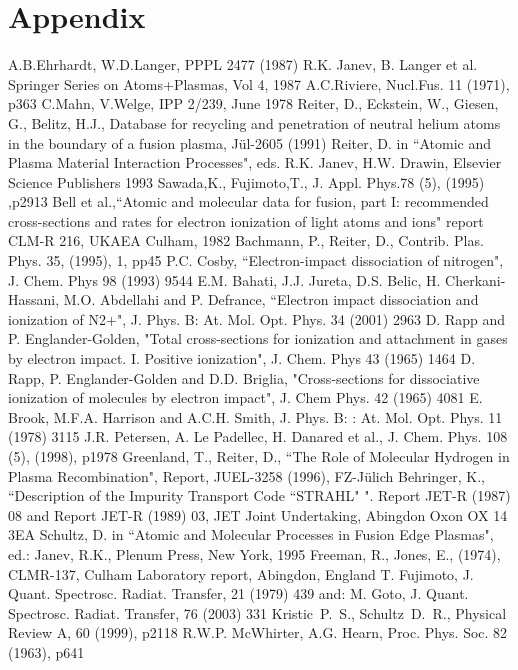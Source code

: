 \documentclass[12pt,dvipdfmx]{article}
\begin{document}
\section{Appendix}
\newpage
\begin{thebibliography}{99}
  A.B.Ehrhardt, W.D.Langer, PPPL 2477 (1987)
 R.K. Janev, B. Langer et al.  Springer Series on Atoms+Plasmas,
                   Vol 4, 1987
 A.C.Riviere, Nucl.Fus. 11 (1971), p363
 C.Mahn, V.Welge, IPP 2/239, June 1978
 Reiter, D., Eckstein, W., Giesen, G., Belitz,
                    H.J.,
                    Database for recycling and penetration of neutral
                    helium atoms in the boundary of a fusion plasma,
                    J\"ul-2605 (1991)
  Reiter, D. in ``Atomic and Plasma Material Interaction Processes", eds. R.K. Janev, H.W. Drawin, Elsevier Science Publishers 1993
 Sawada,K.,  Fujimoto,T., J. Appl. Phys.78 (5), (1995)
                    ,p2913
  Bell et al.,``Atomic and molecular data for fusion, part I:
recommended cross-sections and rates for electron ionization of light atoms and ions"
 report CLM-R 216, UKAEA Culham, 1982
  Bachmann, P., Reiter, D., Contrib. Plas. Phys.
                       35, (1995), 1, pp45
  P.C. Cosby, ``Electron-impact dissociation of nitrogen", J. Chem. Phys 98 (1993) 9544
 E.M. Bahati, J.J. Jureta, D.S. Belic, H. Cherkani-Hassani, M.O. Abdellahi and P. Defrance, ``Electron impact dissociation and ionization of N2+",
J. Phys. B: At. Mol. Opt. Phys. 34 (2001) 2963
 D. Rapp and P. Englander-Golden, "Total cross-sections for ionization and attachment in gases by electron impact. I. Positive ionization", J. Chem. Phys 43 (1965) 1464
 D. Rapp, P. Englander-Golden and D.D. Briglia, "Cross-sections for dissociative ionization of molecules by electron impact", J. Chem Phys. 42 (1965) 4081
 E. Brook, M.F.A. Harrison and A.C.H. Smith, J. Phys. B: : At. Mol. Opt. Phys. 11 (1978) 3115
 J.R. Petersen, A. Le Padellec, H. Danared et al., J. Chem. Phys. 108 (5), (1998), p1978
 Greenland, T., Reiter, D.,
                   ``The Role of Molecular Hydrogen in Plasma
                    Recombination", Report, JUEL-3258 (1996), FZ-J\"ulich
 Behringer, K.,
``Description of the Impurity Transport Code ``STRAHL" ".
Report JET-R (1987) 08 and
Report JET-R (1989) 03, JET Joint Undertaking, Abingdon Oxon OX 14 3EA
 Schultz, D. in ``Atomic and Molecular Processes in Fusion
                     Edge Plasmas", ed.: Janev, R.K., Plenum Press, New York, 1995
 Freeman, R., Jones, E., (1974), CLMR-137, Culham Laboratory report, Abingdon, England
 T.  Fujimoto, J. Quant. Spectrosc. Radiat. Transfer, 21 (1979) 439 and:
M. Goto, J. Quant. Spectrosc. Radiat. Transfer, 76 (2003) 331
 Kristic~P.~S., Schultz~D.~R., Physical Review A, 60 (1999), p2118
 R.W.P. McWhirter, A.G. Hearn, Proc. Phys. Soc. 82 (1963), p641
 \end{thebibliography}
\end{document}
